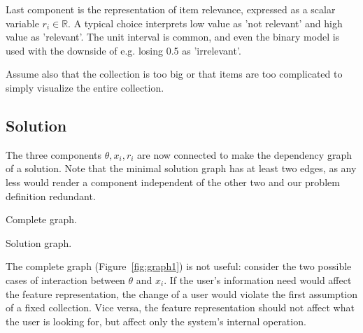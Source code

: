 \documentclass[10pt]{tufte-handout}
\begin{document}
Last component is the representation of item relevance, expressed as a scalar variable $r_i\in \mathbb R$. A typical choice interprets low value as 'not relevant' and high value as 'relevant'. The unit interval is common, and even the binary model is used with the downside of e.g. losing 0.5 as 'irrelevant'.

Assume also that the collection is too big or that items are too complicated to simply visualize the entire collection.

\subsection{Solution}
The three components $ \theta, x_i, r_i$ are now connected to make the dependency graph of a solution. Note that the minimal solution graph has at least two edges, as any less would render a component independent of the other two and our problem definition redundant.

\begin{marginfigure}%
\caption{Complete graph.}
\label{fig:graph1}
\end{marginfigure}

\begin{marginfigure}%
\caption{Solution graph.}
\label{fig:graph2}
\end{marginfigure}

The complete graph (Figure~\ref{fig:graph1}) is not useful: consider
the two possible cases of interaction between $\theta$ and $x_i$. If the user's information need would
affect the feature representation, the change of a user would violate
the first assumption of a fixed collection. Vice versa, the feature
representation should not affect what the user is looking for, but
affect only the system's internal operation. 
\end{document}
